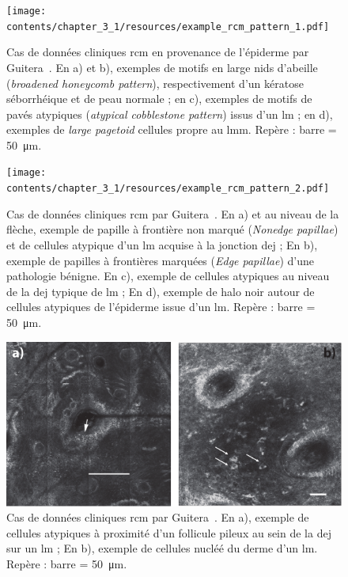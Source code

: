 \begin{figure}[H]
    \begin{center}
        \texttt{[image: contents/chapter\_3\_1/resources/example\_rcm\_pattern\_1.pdf]}
        \caption{Cas de données cliniques \gls{rcm} en provenance de l'épiderme par Guitera~\cite{Guitera2010}. En a) et b), exemples de motifs en large nids d'abeille (\textit{broadened honeycomb pattern}), respectivement d'un kératose séborrhéique et de peau normale ; en c), exemples de motifs de pavés atypiques (\textit{atypical cobblestone pattern}) issus d'un \gls{lm} ; en d), exemples de \textit{large pagetoid} cellules propre au \gls{lmm}. Repère : barre = \SI{50}{\micro\metre}.}
        \label{fig:example_rcm_pattern_1}
    \end{center} 
\end{figure}\par

\begin{figure}[H]
    \begin{center}
        \texttt{[image: contents/chapter\_3\_1/resources/example\_rcm\_pattern\_2.pdf]}
        \caption{Cas de données cliniques \gls{rcm} par Guitera~\cite{Guitera2010}. En a) et au niveau de la flèche, exemple de papille à frontière non marqué (\textit{Nonedge papillae}) et de cellules atypique d'un \gls{lm} acquise à la jonction \gls{dej} ; En b), exemple de papilles à frontières marquées (\textit{Edge papillae}) d'une pathologie bénigne. En c), exemple de cellules atypiques au niveau de la \gls{dej} typique de \gls{lm} ; En d), exemple de halo noir autour de cellules atypiques de l'épiderme issue d'un \gls{lm}. Repère : barre = \SI{50}{\micro\metre}.}
        \label{fig:example_rcm_pattern_2}
    \end{center} 
\end{figure}\par

\begin{figure}[H]
    \begin{center}
        \includegraphics[width=0.8 \linewidth]{contents/chapter_3_1/resources/example_rcm_pattern_3.pdf}
        \caption{Cas de données cliniques \gls{rcm} par Guitera~\cite{Guitera2010}. En a), exemple de cellules atypiques à proximité d'un follicule pileux au sein de la \gls{dej} sur un \gls{lm} ; En b), exemple de cellules nucléé du derme d'un \gls{lm}. Repère : barre = \SI{50}{\micro\metre}.}
        \label{fig:example_rcm_pattern_3}
    \end{center} 
\end{figure}\par

